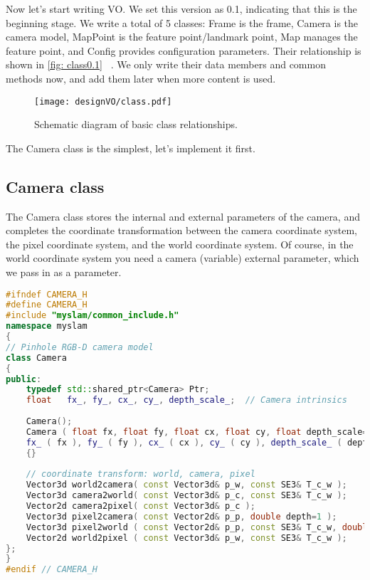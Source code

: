 Now let's start writing VO. We set this version as 0.1, indicating that this is the beginning stage. We write a total of 5 classes: Frame is the frame, Camera is the camera model, MapPoint is the feature point/landmark point, Map manages the feature point, and Config provides configuration parameters. Their relationship is shown in \autoref{fig: class0.1} ~. We only write their data members and common methods now, and add them later when more content is used.

\begin{figure}[!ht]
\centering
\texttt{[image: designVO/class.pdf]}
\caption{Schematic diagram of basic class relationships. }
\label{fig: class0.1}
\end{figure}

The Camera class is the simplest, let's implement it first.
\clearpage

\subsection{Camera class}
The Camera class stores the internal and external parameters of the camera, and completes the coordinate transformation between the camera coordinate system, the pixel coordinate system, and the world coordinate system. Of course, in the world coordinate system you need a camera (variable) external parameter, which we pass in as a parameter.

\begin{lstlisting}[language=c++,caption=slambook/project/0.1/include/myslam/camera.h]
#ifndef CAMERA_H
#define CAMERA_H
#include "myslam/common_include.h"
namespace myslam
{
// Pinhole RGB-D camera model
class Camera
{
public:
	typedef std::shared_ptr<Camera> Ptr;
	float   fx_, fy_, cx_, cy_, depth_scale_;  // Camera intrinsics 
	
	Camera();
	Camera ( float fx, float fy, float cx, float cy, float depth_scale=0 ) :
	fx_ ( fx ), fy_ ( fy ), cx_ ( cx ), cy_ ( cy ), depth_scale_ ( depth_scale )
	{}
	
	// coordinate transform: world, camera, pixel
	Vector3d world2camera( const Vector3d& p_w, const SE3& T_c_w );
	Vector3d camera2world( const Vector3d& p_c, const SE3& T_c_w );
	Vector2d camera2pixel( const Vector3d& p_c );
	Vector3d pixel2camera( const Vector2d& p_p, double depth=1 ); 
	Vector3d pixel2world ( const Vector2d& p_p, const SE3& T_c_w, double depth=1 );
	Vector2d world2pixel ( const Vector3d& p_w, const SE3& T_c_w );
};
}
#endif // CAMERA_H
\end{lstlisting}

